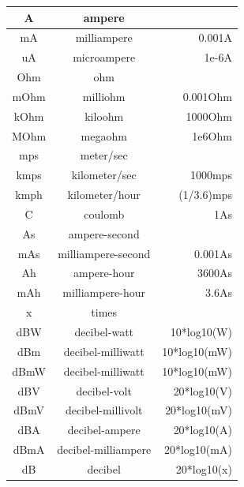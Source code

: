 \begin{longtable}{|c|c|r|}
  A & ampere & \\\hline
  mA & milliampere & 0.001A \\\hline
  uA & microampere & 1e-6A \\\hline
  Ohm & ohm & \\\hline
  mOhm & milliohm & 0.001Ohm \\\hline
  kOhm & kiloohm & 1000Ohm \\\hline
  MOhm & megaohm & 1e6Ohm \\\hline
  mps & meter/sec & \\\hline
  kmps & kilometer/sec & 1000mps \\\hline
  kmph & kilometer/hour & (1/3.6)mps \\\hline
  C & coulomb & 1As \\\hline
  As & ampere-second & \\\hline
  mAs & milliampere-second & 0.001As \\\hline
  Ah & ampere-hour & 3600As \\\hline
  mAh & milliampere-hour & 3.6As \\\hline
  x & times & \\\hline
  dBW & decibel-watt & 10*log10(W) \\\hline
  dBm & decibel-milliwatt & 10*log10(mW) \\\hline
  dBmW & decibel-milliwatt & 10*log10(mW) \\\hline
  dBV & decibel-volt & 20*log10(V) \\\hline
  dBmV & decibel-millivolt & 20*log10(mV) \\\hline
  dBA & decibel-ampere & 20*log10(A) \\\hline
  dBmA & decibel-milliampere & 20*log10(mA) \\\hline
  dB & decibel & 20*log10(x) \\\hline
\end{longtable}



